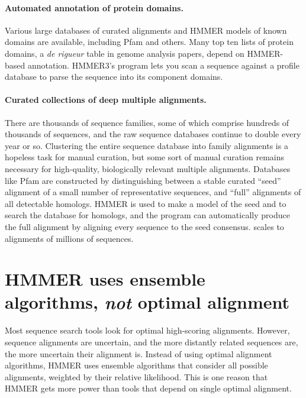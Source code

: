 \paragraph{Automated annotation of protein domains.}
Various large databases of curated alignments and HMMER models of
known domains are available, including Pfam and others.  Many top ten
lists of protein domains, a \emph{de rigueur} table in genome analysis
papers, depend on HMMER-based annotation. HMMER3's 
program lets you scan a sequence against a profile database to parse
the sequence into its component domains.

\paragraph{Curated collections of deep multiple alignments.}  There are thousands of
sequence families, some of which comprise hundreds of thousands of
sequences, and the raw sequence databases continue to double every
year or so. Clustering the entire sequence database into family
alignments is a hopeless task for manual curation, but some sort of
manual curation remains necessary for high-quality, biologically
relevant multiple alignments. Databases like Pfam are constructed by
distinguishing between a stable curated ``seed'' alignment of a small
number of representative sequences, and ``full'' alignments of all
detectable homologs. HMMER is used to make a model of the seed and to
search the database for homologs, and the  program can
automatically produce the full alignment by aligning every sequence to
the seed consensus.  scales to alignments of 
millions of sequences.



\section{HMMER uses ensemble algorithms, \emph{not} optimal alignment}

Most sequence search tools look for optimal high-scoring
alignments. However, sequence alignments are uncertain, and the more
distantly related sequences are, the more uncertain their alignment
is. Instead of using optimal alignment algorithms, HMMER uses ensemble
algorithms that consider all possible alignments, weighted by their
relative likelihood. This is
one reason that HMMER gets more power than tools that depend on single
optimal alignment.

